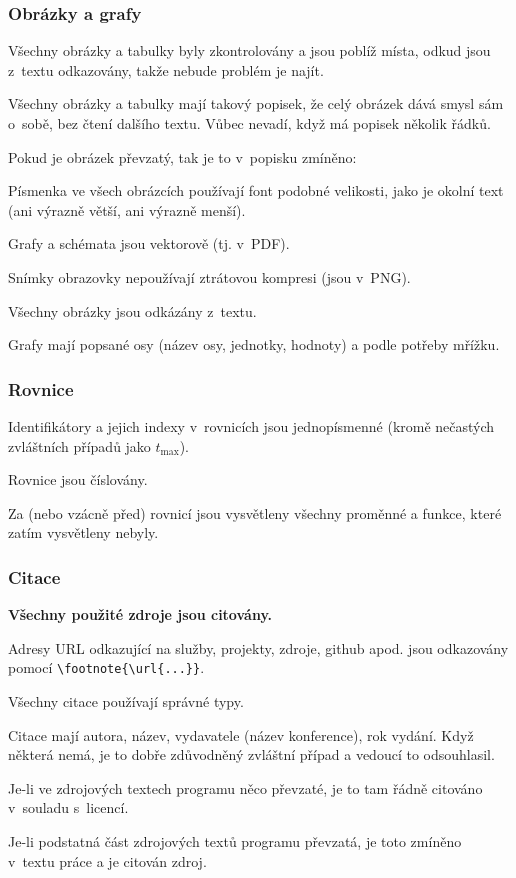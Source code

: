 \subsubsection*{Obrázky a grafy}
\begin{checklist}
	\item Všechny obrázky a tabulky byly zkontrolovány a jsou poblíž místa, odkud jsou z~textu odkazovány, takže nebude problém je najít.
	\item Všechny obrázky a tabulky mají takový popisek, že celý obrázek dává smysl sám o~sobě, bez čtení dalšího textu. Vůbec nevadí, když má popisek několik řádků.
	\item Pokud je obrázek převzatý, tak je to v~popisku zmíněno: 
	\item Písmenka ve všech obrázcích používají font podobné velikosti, jako je okolní text (ani výrazně větší, ani výrazně menší).
	\item Grafy a schémata jsou vektorově (tj. v~PDF).
	\item Snímky obrazovky nepoužívají ztrátovou kompresi (jsou v~PNG).
	\item Všechny obrázky jsou odkázány z~textu.
	\item Grafy mají popsané osy (název osy, jednotky, hodnoty) a podle potřeby mřížku.
\end{checklist}

\subsubsection*{Rovnice}
\begin{checklist}
	\item Identifikátory a jejich indexy v~rovnicích jsou jednopísmenné (kromě nečastých zvláštních případů jako $t_\mathrm{max}$).
	\item Rovnice jsou číslovány.
	\item Za (nebo vzácně před) rovnicí jsou vysvětleny všechny proměnné a funkce, které zatím vysvětleny nebyly.
\end{checklist}

\subsubsection*{Citace}
\begin{checklist}
    \item \textbf{Všechny použité zdroje jsou citovány.}
	\item Adresy URL odkazující na služby, projekty, zdroje, github apod. jsou odkazovány pomocí \verb|\footnote{\url{...}}|.
    \item Všechny citace používají správné typy.
	\item Citace mají autora, název, vydavatele (název konference), rok vydání.  Když některá nemá, je to dobře zdůvodněný zvláštní případ a vedoucí to odsouhlasil.
	\item Je-li ve zdrojových textech programu něco převzaté, je to tam řádně citováno v~souladu s~licencí.
	\item Je-li podstatná část zdrojových textů programu převzatá, je toto zmíněno v~textu práce a je citován zdroj.
\end{checklist}

